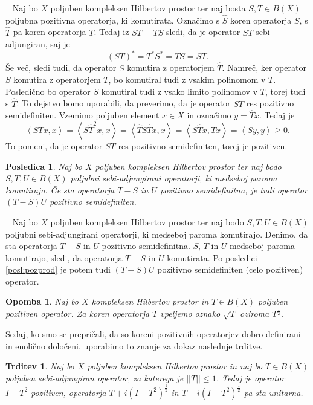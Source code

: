 \documentclass[12pt,a4paper,oneside,fleqn,openany]{book}
\newtheorem{posledica}[izrek]{Posledica}
\newtheorem{trditev}[izrek]{Trditev}
\newtheorem{opomba}[izrek]{Opomba}
\newcommand{\eopf}{\raisebox{0.8ex}{\framebox{}}} %
\newenvironment{dokaz}%
{\noindent{\bf Dokaz.}\ }%
{\hfill\eopf\par\bigskip}%
\newcommand{\abs}[1]{\ensuremath{\lvert #1 \rvert}}
\newcommand{\norm}[1]{\abs{\abs{#1}}}
\newcommand{\Sp}[2]{\ensuremath{\left<#1, #2\right>}}
\begin{document}
\begin{dokaz}
	Naj bo $X$ poljuben kompleksen Hilbertov prostor ter naj bosta $S, T\in B(X)$ poljubna pozitivna operatorja, ki komutirata. Označimo s $\hat{S}$ koren operatorja $S$, s $\hat{T}$ pa koren operatorja $T$. Tedaj iz $ST = TS$ sledi, da je operator $ST$ sebi-adjungiran, saj je $$(ST)^*=T^*S^*=TS=ST.$$ Še več, sledi tudi, da operator $S$ komutira z operatorjem $\hat{T}$. Namreč, ker operator $S$ komutira z operatorjem $T$, bo komutiral tudi z vsakim polinomom v $T$. Posledično bo operator $S$ komutiral tudi z vsako limito polinomov v $T$, torej tudi s $\hat{T}$. To dejstvo bomo uporabili, da preverimo, da je operator $ST$ res pozitivno semidefiniten. Vzemimo poljuben element $x\in X$ in označimo $y=\hat{T}x$. Tedaj je $$\Sp{STx}{x} = \Sp{S\hat{T}^2x}{x} = \Sp{\hat{T}S\hat{T}x}{x} = \Sp{S\hat{T}x}{\hat{T}x}=\Sp{Sy}{y}\geq 0.$$
	To pomeni, da je operator $ST$ res pozitivno semidefiniten, torej je pozitiven.
\end{dokaz}

\begin{posledica}
	\label{posl:pozprod2} Naj bo $X$ poljuben kompleksen Hilbertov prostor ter naj bodo $S, T, U\in B(X)$ poljubni sebi-adjungirani operatorji, ki medseboj paroma komutirajo. Če sta operatorja $T-S$ in $U$ pozitivno semidefinitna, je tudi operator $(T-S)U$ pozitivno semidefiniten.
\end{posledica}

\begin{dokaz}
	Naj bo $X$ poljuben kompleksen Hilbertov prostor ter naj bodo $S, T, U\in B(X)$ poljubni sebi-adjungirani operatorji, ki medseboj paroma komutirajo. Denimo, da sta operatorja $T-S$ in $U$ pozitivno semidefinitna. $S$, $T$ in $U$ medseboj paroma komutirajo, sledi, da operatorja $T-S$ in $U$ komutirata. Po posledici \ref{posl:pozprod} je potem tudi $(T-S)U$ pozitivno semidefiniten (celo pozitiven) operator.
\end{dokaz}

\begin{opomba}
	\label{opomb:pozkorenozn}
	Naj bo $X$ kompleksen Hilbertov prostor in $T\in B(X)$ poljuben pozitiven operator. Za koren operatorja $T$ vpeljemo oznako $\sqrt{T}$ oziroma $T^{\frac{1}{2}}$.
\end{opomba}

Sedaj, ko smo se prepričali, da so koreni pozitivnih operatorjev dobro definirani in enolično določeni, uporabimo to znanje za dokaz naslednje trditve.

\begin{trditev}
	\label{trd:razlpozinuni}
	Naj bo $X$ poljuben kompleksen Hilbertov prostor in naj bo $T\in B(X)$ poljuben sebi-adjungiran operator, za katerega je $\norm{T}\leq 1$. Tedaj je operator $I - T^2$ pozitiven, operatorja $T + i(I-T^2)^{\frac{1}{2}}$ in $T - i(I-T^2)^{\frac{1}{2}}$ pa sta unitarna.
\end{trditev}
\end{document}
